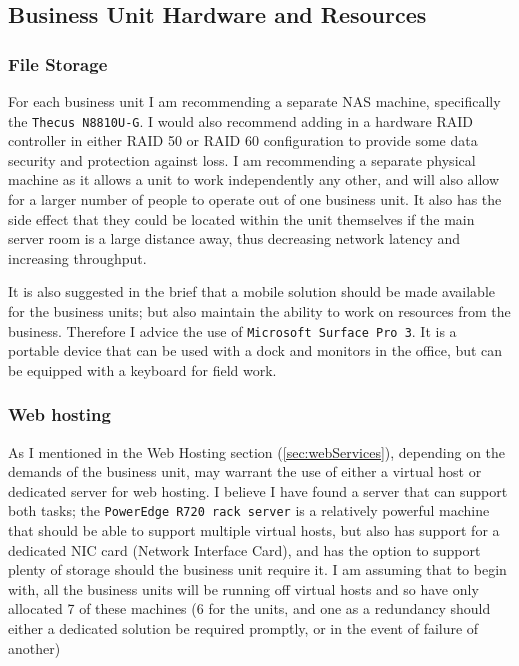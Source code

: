 \documentclass[10pt]{article}
\begin{document}
        \subsection{Business Unit Hardware and Resources}
            \subsubsection{File Storage}
                For each business unit I am recommending a separate NAS machine, specifically the \texttt{Thecus N8810U-G}\cite{cite:thecusNas}. I would also recommend adding in a hardware RAID controller in either RAID 50 or RAID 60 configuration to provide some data security and protection against loss. I am recommending a separate physical machine as it allows a unit to work independently any other, and will also allow for a larger number of people to operate out of one business unit. It also has the side effect that they could be located within the unit themselves if the main server room is a large distance away, thus decreasing network latency and increasing throughput. 

                It is also suggested in the brief that a mobile solution should be made available for the business units; but also maintain the ability to work on resources from the business. Therefore I advice the use of \texttt{Microsoft Surface Pro 3}\cite{cite:surfacePro3}. It is a portable device that can be used with a dock and monitors in the office, but can be equipped with a keyboard for field work. 

            \subsubsection{Web hosting}
                As I mentioned in the Web Hosting section (\ref{sec:webServices}), depending on the demands of the business unit, may warrant the use of either a virtual host or dedicated server for web hosting. I believe I have found a server that can support both tasks; the \texttt{PowerEdge R720 rack server}\cite{cite:dellPowerEdge} is a relatively powerful machine that should be able to support multiple virtual hosts, but also has support for a dedicated NIC card (Network Interface Card), and has the option to support plenty of storage should the business unit require it. I am assuming that to begin with, all the business units will be running off virtual hosts and so have only allocated 7 of these machines (6 for the units, and one as a redundancy should either a dedicated solution be required promptly, or in the event of failure of another)
\end{document}
